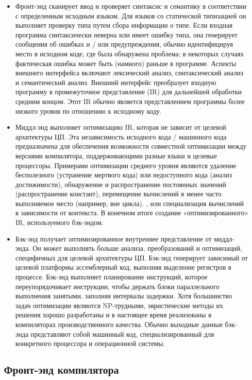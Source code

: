 \begin{itemize}
    \item Фронт-энд сканирует ввод и проверяет синтаксис и семантику в соответствии с определенным исходным языком. Для языков со статической типизацией он выполняет проверку типа путем сбора информации о типе. Если входная программа синтаксически неверна или имеет ошибку типа, она генерирует сообщения об ошибках и / или предупреждения, обычно идентифицируя место в исходном коде, где была обнаружена проблема; в некоторых случаях фактическая ошибка может быть (намного) раньше в программе. Аспекты внешнего интерфейса включают лексический анализ, синтаксический анализ и семантический анализ. Внешний интерфейс преобразует входную программу в промежуточное представление (IR) для дальнейшей обработки средним концом. Этот IR обычно является представлением программы более низкого уровня по отношению к исходному коду. 
    \item Миддл-энд выполняет оптимизацию IR, которая не зависит от целевой архитектуры ЦП. Эта независимость исходного кода / машинного кода предназначена для обеспечения возможности совместной оптимизации между версиями компилятора, поддерживающими разные языки и целевые процессоры. Примерами оптимизации среднего уровня являются удаление бесполезного (устранение мертвого кода) или недоступного кода (анализ достижимости), обнаружение и распространение постоянных значений (распространение констант), перемещение вычислений в менее часто выполняемое место (например, вне цикла). , или специализация вычислений в зависимости от контекста. В конечном итоге создание «оптимизированного» IR, используемого бэк-эндом.
    \item Бэк-энд получает оптимизированное внутреннее представление от миддл-энда. Он может выполнять больше анализа, преобразований и оптимизаций, специфичных для целевой архитектуры ЦП. Бэк-энд генерирует зависимый от целевой платформы ассемблерный код, выполняя выделение регистров в процессе. Бэк-энд выполняет планирование инструкций, которое переупорядочивает инструкции, чтобы держать блоки параллельного выполнения занятыми, заполняя интервалы задержки. Хотя большинство задач оптимизации являются NP-трудными, эвристические методы их решения хорошо разработаны и в настоящее время реализованы в компиляторах производственного качества. Обычно выходные данные бэк-энда представляют собой машинный код, специализированный для конкретного процессора и операционной системы.  
\end{itemize}

\subsection{Фронт-энд компилятора}\label{sec:ch1/sec5/subsec2}


